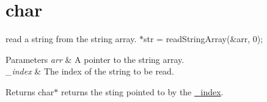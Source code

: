 \hypertarget{char-example}{}\section{char}
read a string from the string array. $\ast$str = read\+String\+Array(\&arr, 0); 
\begin{DoxyParams}{Parameters}
{\em arr} & A pointer to the string array. \\
\hline
{\em \+\_\+index} & The index of the string to be read.\\
\hline
\end{DoxyParams}
\begin{DoxyReturn}{Returns}
char$\ast$ returns the sting pointed to by the \hyperlink{}{\+\_\+index}.
\end{DoxyReturn}

\begin{DoxyCodeInclude}
\end{DoxyCodeInclude}
 